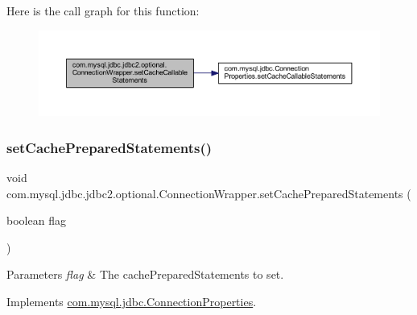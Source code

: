 Here is the call graph for this function\+:
\nopagebreak
\begin{figure}[H]
\begin{center}
\leavevmode
\includegraphics[width=350pt]{classcom_1_1mysql_1_1jdbc_1_1jdbc2_1_1optional_1_1_connection_wrapper_a0f60cd752383652f21a16f404ee107c2_cgraph}
\end{center}
\end{figure}
\mbox{\label{classcom_1_1mysql_1_1jdbc_1_1jdbc2_1_1optional_1_1_connection_wrapper_aa4df80c0af9ab1c8788c6d09d641d33b}} 
\subsubsection{\texorpdfstring{set\+Cache\+Prepared\+Statements()}{setCachePreparedStatements()}}
{\footnotesize\ttfamily void com.\+mysql.\+jdbc.\+jdbc2.\+optional.\+Connection\+Wrapper.\+set\+Cache\+Prepared\+Statements (\begin{DoxyParamCaption}\item[{boolean}]{flag }\end{DoxyParamCaption})}


\begin{DoxyParams}{Parameters}
{\em flag} & The cache\+Prepared\+Statements to set. \\
\hline
\end{DoxyParams}


Implements \mbox{\hyperlink{interfacecom_1_1mysql_1_1jdbc_1_1_connection_properties_a990fe5790551ed49878ecc8bceb750a5}{com.\+mysql.\+jdbc.\+Connection\+Properties}}.

